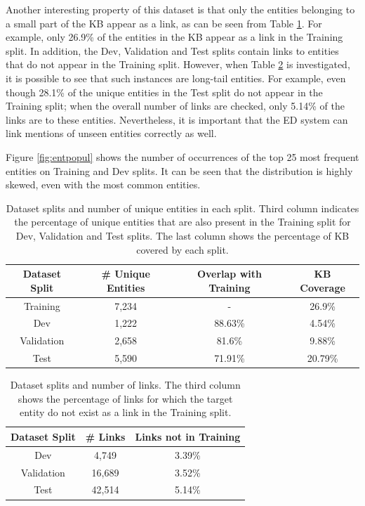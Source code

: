 \documentclass{report}
\theoremstyle{definition}
\theoremstyle{remark}
\begin{document}
Another interesting property of this dataset is that only the entities belonging to a small part of the KB appear as a link, as can be seen from Table \ref{tab:goldstatsed2}. For example, only 26.9\% of the entities in the KB appear as a link in the Training split. In addition, the  Dev, Validation and Test splits contain links to entities that do not appear in the Training split. However, when  Table \ref{tab:goldstatsed3} is investigated, it is possible to see that such instances are long-tail entities. For example, even though 28.1\% of the unique entities in the Test split do not appear in the Training split; when the overall number of links are checked, only 5.14\% of the links are to these entities. Nevertheless, it is important that the ED system can link mentions of unseen entities correctly as well.


Figure \ref{fig:entpopul} shows the number of occurrences of the top 25 most frequent entities on Training and Dev splits. It can be seen that the distribution is highly skewed, even with the most common entities. 

\begin{table}
    \centering
    \begin{tabular}{cccc}
    Dataset Split & \# Unique Entities & Overlap with Training & KB Coverage\\
    \hline
    Training & 7,234 & - & 26.9\%\\
    Dev & 1,222 & 88.63\% & 4.54\%\\
    Validation & 2,658 & 81.6\% & 9.88\%\\
    Test & 5,590 & 71.91\%& 20.79\%\\
    \end{tabular}
    \caption{Dataset splits and number of unique entities in each split. Third column indicates the percentage of unique entities that are also present in the Training split for Dev, Validation and Test splits. The last column shows the percentage of KB covered by each split.}
    \label{tab:goldstatsed2}
\end{table}

\begin{table}
    \centering
    \begin{tabular}{ccc}
    Dataset Split & \# Links & Links not in Training\\
    \hline
    Dev & 4,749 & 3.39\% \\
    Validation & 16,689 & 3.52\% \\
    Test & 42,514 & 5.14\% \\
    \end{tabular}
    \caption{Dataset splits and number of links. The third column shows the percentage of links for which the target entity do not exist as a link in the Training split.}
    \label{tab:goldstatsed3}
\end{table}
\end{document}
